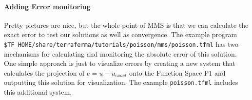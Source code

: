 \paragraph{Adding Error monitoring}
\label{sec:adding-error-monit}

Pretty pictures are nice,  but the whole point of MMS is that we can
calculate the exact error to test our solutions as well as
convergence.  The example program
\texttt{\$TF\_HOME/share/terraferma/tutorials/poisson/mms/poisson.tfml} has two
mechanisms for calculating and monitoring the absolute error of this
solution.  One simple approach is just to  visualize errors by
creating a new system that calculates the projection of $e = u -
u_{exact}$ onto the Function Space P1 and outputting this solution for
visualization.  The example \texttt{poisson.tfml} includes this
additional system.

